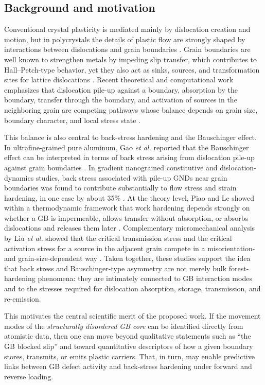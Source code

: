 \documentclass[11pt]{article}
\begin{document}
\subsection*{Background and motivation}
Conventional crystal plasticity is mediated mainly by dislocation creation and motion, but in polycrystals the details of plastic flow are strongly shaped by interactions between dislocations and grain boundaries \cite{Cordero2016,Javaid2021}. Grain boundaries are well known to strengthen metals by impeding slip transfer, which contributes to Hall--Petch-type behavior, yet they also act as sinks, sources, and transformation sites for lattice dislocations \cite{Cordero2016,Javaid2021}. Recent theoretical and computational work emphasizes that dislocation pile-up against a boundary, absorption by the boundary, transfer through the boundary, and activation of sources in the neighboring grain are competing pathways whose balance depends on grain size, boundary character, and local stress state \cite{Piao2022,Liu2020}.

This balance is also central to back-stress hardening and the Bauschinger effect. In ultrafine-grained pure aluminum, Gao \emph{et al.} reported that the Bauschinger effect can be interpreted in terms of back stress arising from dislocation pile-up against grain boundaries \cite{Gao2022}. In gradient nanograined constitutive and dislocation-dynamics studies, back stress associated with pile-up GNDs near grain boundaries was found to contribute substantially to flow stress and strain hardening, in one case by about 35\% \cite{Zhao2020,WuDDD2022}. At the theory level, Piao and Le showed within a thermodynamic framework that work hardening depends strongly on whether a GB is impermeable, allows transfer without absorption, or absorbs dislocations and releases them later \cite{Piao2022}. Complementary micromechanical analysis by Liu \emph{et al.} showed that the critical transmission stress and the critical activation stress for a source in the adjacent grain compete in a misorientation- and grain-size-dependent way \cite{Liu2020}. Taken together, these studies support the idea that back stress and Bauschinger-type asymmetry are not merely bulk forest-hardening phenomena: they are intimately connected to GB interaction modes and to the stresses required for dislocation absorption, storage, transmission, and re-emission.

This motivates the central scientific merit of the proposed work. If the movement modes of the \emph{structurally disordered GB core} can be identified directly from atomistic data, then one can move beyond qualitative statements such as ``the GB blocked slip'' and toward quantitative descriptors of how a given boundary stores, transmits, or emits plastic carriers. That, in turn, may enable predictive links between GB defect activity and back-stress hardening under forward and reverse loading.
\end{document}
